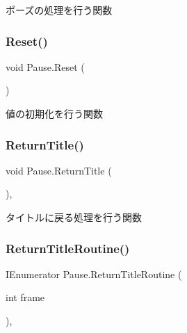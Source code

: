 ポーズの処理を行う関数 

\mbox{\label{class_pause_a1bed2e1a05bef4f1d9fcaeba5b8bd2fe}} 
\subsubsection{\texorpdfstring{Reset()}{Reset()}}
{\footnotesize\ttfamily void Pause.\+Reset (\begin{DoxyParamCaption}{ }\end{DoxyParamCaption})\hspace{0.3cm}{\ttfamily [inline]}}



値の初期化を行う関数 

\mbox{\label{class_pause_a132605f67bd5ff4dacdec6adfcb104f0}} 
\subsubsection{\texorpdfstring{Return\+Title()}{ReturnTitle()}}
{\footnotesize\ttfamily void Pause.\+Return\+Title (\begin{DoxyParamCaption}{ }\end{DoxyParamCaption})\hspace{0.3cm}{\ttfamily [inline]}, {\ttfamily [private]}}



タイトルに戻る処理を行う関数 

\mbox{\label{class_pause_ac99fd26d97c3fb53f035c64a7f77c7d0}} 
\subsubsection{\texorpdfstring{Return\+Title\+Routine()}{ReturnTitleRoutine()}}
{\footnotesize\ttfamily I\+Enumerator Pause.\+Return\+Title\+Routine (\begin{DoxyParamCaption}\item[{int}]{frame }\end{DoxyParamCaption})\hspace{0.3cm}{\ttfamily [inline]}, {\ttfamily [private]}}



